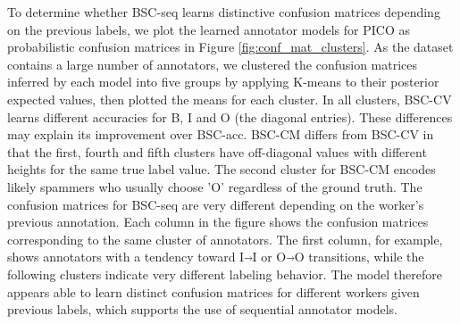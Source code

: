 To determine whether BSC-seq learns distinctive confusion matrices depending on the previous labels,
we plot the learned annotator models for
PICO as probabilistic confusion matrices in Figure \ref{fig:conf_mat_clusters}.
As the dataset contains a large number of annotators, we clustered 
the confusion matrices inferred by each model
into five groups by applying K-means to their posterior expected values,
then plotted the means for each cluster.
In all clusters, BSC-CV learns different accuracies for B, I and O (the diagonal entries). 
These differences may explain its
improvement over BSC-acc.
BSC-CM differs from BSC-CV in that %
the first, fourth and fifth clusters 
have off-diagonal values with different heights for the same true label value.
 The second 
cluster for BSC-CM encodes likely spammers who usually choose 'O' regardless of the 
ground truth. 
The confusion matrices for BSC-seq are
very different depending on the worker's previous annotation. 
Each column in the figure shows the confusion matrices corresponding to the same cluster of annotators. 
The first column, for example, shows
annotators with a tendency toward I$\Arrow{0.2cm}$I or O$\Arrow{0.2cm}$O transitions, while the following clusters 
indicate very different labeling behavior. The model therefore appears able to learn
distinct confusion matrices for different workers given previous labels, which supports the use of sequential
annotator models.

